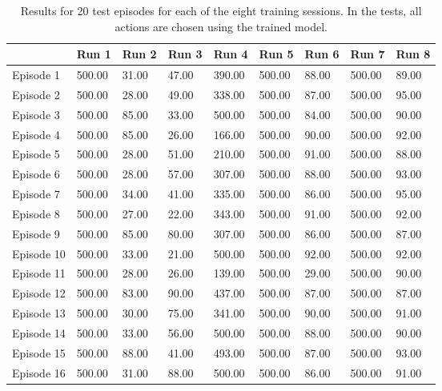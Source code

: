  \begin{table}[H]
 \caption{Results for 20 test episodes for each of the eight training sessions. In the tests, all actions are chosen using the trained model.}

 \begin{tabular}{l|l|l|l|l|l|l|l|l|}
 \cline{2-9}
 & Run 1 & Run 2 & Run 3 & Run 4 & Run 5 & Run 6& Run 7 & Run 8 \\ \hline
 \multicolumn{1}{|l|}{Episode 1} & 500.00 & 31.00 & 47.00 & 390.00 & 500.00 & 88.00& 500.00 & 89.00\\
 \multicolumn{1}{|l|}{Episode 2} & 500.00 & 28.00 & 49.00 & 338.00 & 500.00 & 87.00& 500.00 & 95.00\\
 \multicolumn{1}{|l|}{Episode 3} & 500.00 & 85.00 & 33.00 & 500.00 & 500.00 & 84.00& 500.00 & 90.00\\
 \multicolumn{1}{|l|}{Episode 4} & 500.00 & 85.00 & 26.00 & 166.00 & 500.00 & 90.00& 500.00 & 92.00\\
 \multicolumn{1}{|l|}{Episode 5} & 500.00 & 28.00 & 51.00 & 210.00 & 500.00 & 91.00& 500.00 & 88.00\\
 \multicolumn{1}{|l|}{Episode 6} & 500.00 & 28.00 & 57.00 & 307.00 & 500.00 & 88.00& 500.00 & 93.00\\
 \multicolumn{1}{|l|}{Episode 7} & 500.00 & 34.00 & 41.00 & 335.00 & 500.00 & 86.00& 500.00 & 95.00\\
 \multicolumn{1}{|l|}{Episode 8} & 500.00 & 27.00 & 22.00 & 343.00 & 500.00 & 91.00& 500.00 & 92.00\\
 \multicolumn{1}{|l|}{Episode 9} & 500.00 & 85.00 & 80.00 & 307.00 & 500.00 & 86.00& 500.00 & 87.00\\
 \multicolumn{1}{|l|}{Episode 10} & 500.00 & 33.00 & 21.00 & 500.00 & 500.00 & 92.00& 500.00 & 92.00\\
 \multicolumn{1}{|l|}{Episode 11} & 500.00 & 28.00 & 26.00 & 139.00 & 500.00 & 29.00& 500.00 & 90.00\\
 \multicolumn{1}{|l|}{Episode 12} & 500.00 & 83.00 & 90.00 & 437.00 & 500.00 & 87.00& 500.00 & 87.00\\
 \multicolumn{1}{|l|}{Episode 13} & 500.00 & 30.00 & 75.00 & 341.00 & 500.00 & 90.00& 500.00 & 91.00\\
 \multicolumn{1}{|l|}{Episode 14} & 500.00 & 33.00 & 56.00 & 500.00 & 500.00 & 88.00& 500.00 & 90.00\\
 \multicolumn{1}{|l|}{Episode 15} & 500.00 & 88.00 & 41.00 & 493.00 & 500.00 & 87.00& 500.00 & 93.00\\
 \multicolumn{1}{|l|}{Episode 16} & 500.00 & 31.00 & 88.00 & 500.00 & 500.00 & 86.00& 500.00 & 91.00\\

\end{tabular}
\end{table}
